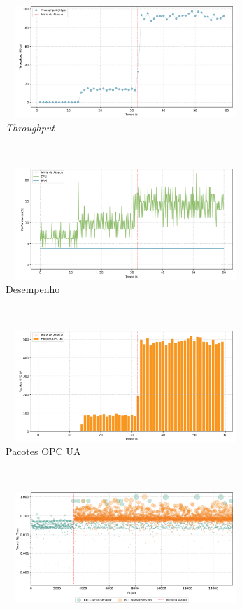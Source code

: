 \begin{apendicesenv}
\begin{figure}[htbp!]
    \centering
    \begin{subfigure}[t]{0.5\textwidth}
        \centering
        \includegraphics[width=1\textwidth, height=120pt]{USPSC-img/output/cropped/2-dos_open_multiple_secure_channels-tput.png}
        \caption{\textit{Throughput}}
    \end{subfigure}%
    ~ 
    \begin{subfigure}[t]{0.5\textwidth}
        \centering
        \includegraphics[width=1\textwidth, height=120pt]{USPSC-img/output/cropped/2-dos_open_multiple_secure_channels-perf.png}
        \caption{Desempenho}
    \end{subfigure}%
    \\
    \begin{subfigure}[t]{0.5\textwidth}
        \centering
        \includegraphics[width=1\textwidth, height=120pt]{USPSC-img/output/cropped/2-dos_open_multiple_secure_channels-pack.png}
        \caption{Pacotes OPC UA}
    \end{subfigure}%
    ~
    \begin{subfigure}[t]{0.5\textwidth}
        \centering
        \includegraphics[width=1\textwidth, height=120pt]{USPSC-img/output/cropped/2-dos_open_multiple_secure_channels-rttp.png}

\end{subfigure}
\end{figure}
\end{apendicesenv}

